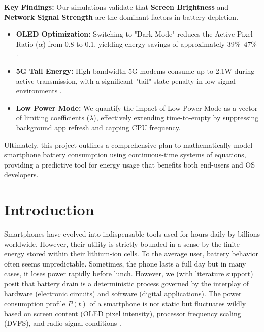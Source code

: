 \documentclass[12pt]{article}
\begin{document}
\textbf{Key Findings:}
Our simulations validate that \textbf{Screen Brightness} and \textbf{Network Signal Strength} are the dominant factors in battery depletion.
\begin{itemize}
    \item \textbf{OLED Optimization:} Switching to "Dark Mode" reduces the Active Pixel Ratio ($\alpha$) from 0.8 to 0.1, yielding energy savings of approximately 39\%--47\% \cite{5}.
    \item \textbf{5G Tail Energy:} High-bandwidth 5G modems consume up to 2.1W during active transmission, with a significant "tail" state penalty in low-signal environments \cite{13}.
    \item \textbf{Low Power Mode:} We quantify the impact of Low Power Mode as a vector of limiting coefficients ($\lambda$), effectively extending time-to-empty by suppressing background app refresh and capping CPU frequency.
\end{itemize}

Ultimately, this project outlines a comprehensive plan to mathematically model smartphone battery consumption using continuous-time systems of equations, providing a predictive tool for energy usage that benefits both end-users and OS developers.

\newpage

\tableofcontents
\newpage

\setcounter{page}{3}

\section{Introduction}

Smartphones have evolved into indispensable tools used for hours daily by billions worldwide. However, their utility is strictly bounded in a sense by the finite energy stored within their lithium-ion cells. To the average user, battery behavior often seems unpredictable. Sometimes, the phone lasts a full day but in many cases, it loses power rapidly before lunch. However, we (with literature support) posit that battery drain is a deterministic process governed by the interplay of hardware (electronic circuits) and software (digital applications). The power consumption profile $P(t)$ of a smartphone is not static but fluctuates wildly based on screen content (OLED pixel intensity), processor frequency scaling (DVFS), and radio signal conditions \cite{1}.
\end{document}
